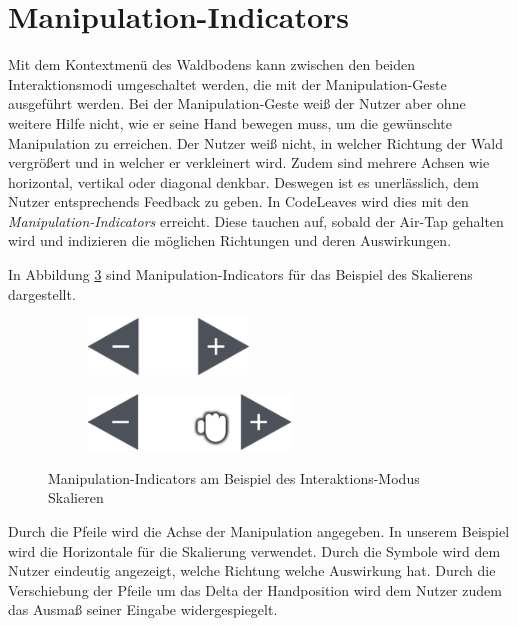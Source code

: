 \section{Manipulation-Indicators}
\label{subsec:manipulation-indicators}
Mit dem Kontextmenü des Waldbodens kann zwischen den beiden Interaktionsmodi umgeschaltet werden, die mit der Manipulation-Geste ausgeführt werden. Bei der Manipulation-Geste weiß der Nutzer aber ohne weitere Hilfe nicht, wie er seine Hand bewegen muss, um die gewünschte Manipulation zu erreichen. Der Nutzer weiß nicht, in welcher Richtung der Wald vergrößert und in welcher er verkleinert wird. Zudem sind mehrere Achsen wie horizontal, vertikal oder diagonal denkbar. Deswegen ist es unerlässlich, dem Nutzer entsprechends Feedback zu geben. In CodeLeaves wird dies mit den \textit{Manipulation-Indicators} erreicht. Diese tauchen auf, sobald der Air-Tap gehalten wird und indizieren die möglichen Richtungen und deren Auswirkungen.

In Abbildung \ref{fig:manipulation} sind Manipulation-Indicators für das Beispiel des Skalierens dargestellt.

\begin{figure}[htb]
  \centering
  \begin{subfigure}[t]{\fwidth}
    \centering
    \includegraphics[height=1.5cm]{figures/manipulation}
     \label{fig:manipulation}
  \end{subfigure}
  \begin{subfigure}[t]{\fwidth}
    \centering
  	\includegraphics[height=1.5cm]{figures/manipulation-drag}
  	 \label{fig:manipulation-drag}
  \end{subfigure}
  \caption{Manipulation-Indicators am Beispiel des Interaktions-Modus Skalieren} \label{fig:manipulation}
\end{figure}

Durch die Pfeile wird die Achse der Manipulation angegeben. In unserem Beispiel wird die Horizontale für die Skalierung verwendet. Durch die Symbole wird dem Nutzer eindeutig angezeigt, welche Richtung welche Auswirkung hat. Durch die Verschiebung der Pfeile um das Delta der Handposition wird dem Nutzer zudem das Ausmaß seiner Eingabe widergespiegelt.

